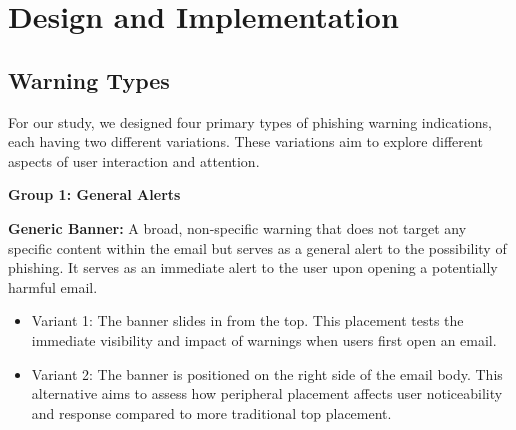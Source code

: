 \documentclass[
  a4paper,  %
  twoside,  %
  bibliography=totoc,
  headsepline,
  cleardoublepage=empty,
  parskip=half,
  draft=false
]{scrbook}
\begin{document}
\chapter{Design and Implementation}
\label{implementation}

\section{Warning Types}
For our study, we designed four primary types of phishing warning indications, each having two different variations. These variations aim to explore different aspects of user interaction and attention.

\textbf{Group 1: General Alerts}

\textbf{Generic Banner:} A broad, non-specific warning that does not target any specific content within the email but serves as a general alert to the possibility of phishing. It serves as an immediate alert to the user upon opening a potentially harmful email.

\begin{itemize}
    \item Variant 1: The banner slides in from the top. This placement tests the immediate visibility and impact of warnings when users first open an email. 
    \item Variant 2: The banner is positioned on the right side of the email body. This alternative aims to assess how peripheral placement affects user noticeability and response compared to more traditional top placement.\par
\end{itemize}
\end{document}
